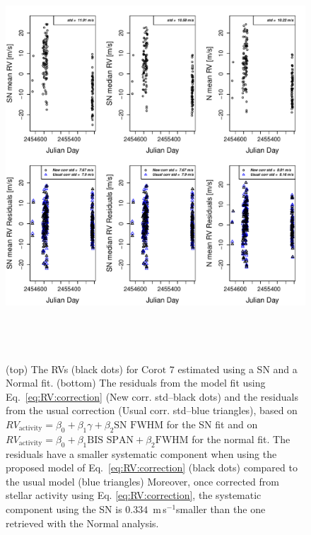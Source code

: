 \documentclass{aa}
\def\ms{\hbox{\,m\,s$^{-1}$}}         %
\begin{document}
\begin{figure} 
\begin{center}
\includegraphics[height = 6in]{NEW_CORRECTIONLRa01_E_[3]CorrectionActivity_RadialVelocity_vs_time.pdf} 
   \caption{(top) The RVs (black dots) for $\text{Corot }7$ estimated using a SN and a Normal fit.
 (bottom) The residuals from the model fit using Eq.~\ref{eq:RV:correction} (New corr. std--black dots) and the residuals from the usual correction (Usual corr. std--blue triangles), based on $RV_{\text{activity}}=\beta_0+\beta_1 \gamma + \beta_2 \text{SN FWHM}$ for the SN fit and on $RV_{\text{activity}}=\beta_0+\beta_1 \text{BIS SPAN} + \beta_2 \text{FWHM}$ for the normal fit. The residuals have a smaller systematic component when using the proposed model of Eq.~\ref{eq:RV:correction} (black dots) compared to the usual model (blue triangles) Moreover, once corrected from stellar activity using Eq. \ref{eq:RV:correction}, the systematic component using the SN is $0.334$ \ms smaller than the one retrieved with the Normal analysis.}
   \label{fig:Corot-7:correctionRV}
\end{center}
\end{figure}
\end{document}
